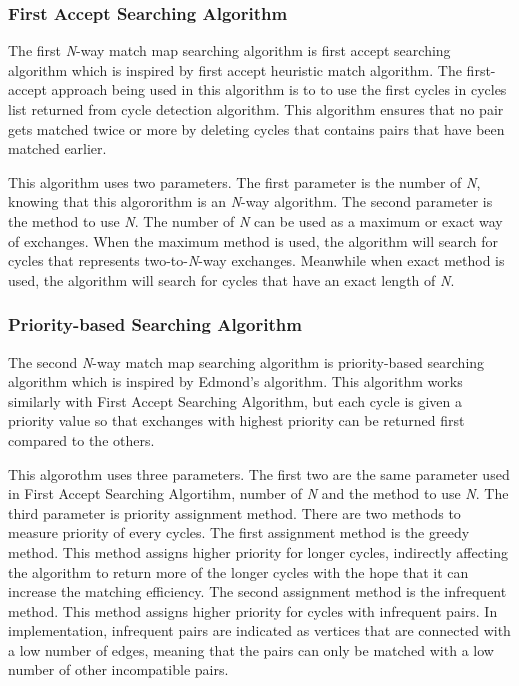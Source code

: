 \documentclass[conference]{IEEEtran}
\begin{document}
\subsubsection{First Accept Searching Algorithm}
The first \textit{N}-way match map searching algorithm is first accept searching algorithm which is inspired by first accept
heuristic match algorithm. The first-accept approach being used in this algorithm is to to use the first cycles in cycles list
returned from cycle detection algorithm. This algorithm ensures that no pair gets matched twice or more by deleting cycles that
contains pairs that have been matched earlier.

This algorithm uses two parameters. The first parameter is the number of \textit{N}, knowing that this algororithm is an \textit{N}-way
algorithm. The second parameter is the method to use \textit{N}. The number of \textit{N} can be used as a maximum or exact way of exchanges.
When the maximum method is used, the algorithm will search for cycles that represents two-to-\textit{N}-way exchanges. Meanwhile when exact
method is used, the algorithm will search for cycles that have an exact length of \textit{N}.  

\subsubsection{Priority-based Searching Algorithm}
The second \textit{N}-way match map searching algorithm is priority-based searching algorithm which is inspired by Edmond's
algorithm. This algorithm works similarly with First Accept Searching Algorithm, but each cycle is given a priority value so
that exchanges with highest priority can be returned first compared to the others.

This algorothm uses three parameters. The first two are the same parameter used in First Accept Searching Algortihm, number of \textit{N}
and the method to use \textit{N}. The third parameter is priority assignment method. There are two methods to measure priority of every cycles.
The first assignment method is the greedy method. This method assigns higher priority for longer cycles, indirectly affecting the algorithm
to return more of the longer cycles with the hope that it can increase the matching efficiency.
The second assignment method is the infrequent method. This method assigns higher priority for cycles with infrequent pairs. In implementation,
infrequent pairs are indicated as vertices that are connected with a low number of edges, meaning that the pairs can only be matched with a low
number of other incompatible pairs.
\end{document}
